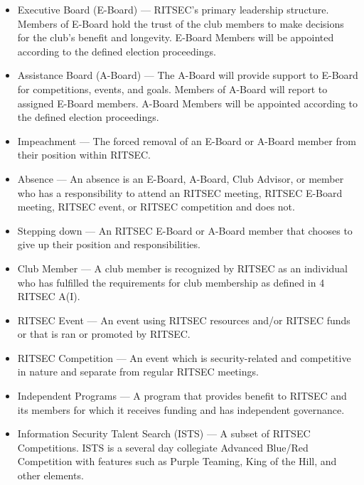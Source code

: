 \begin{itemize}
      \item Executive Board (E-Board) --- RITSEC's primary leadership structure. Members of
            E-Board hold the trust of the club members to make decisions for the club's
            benefit and longevity. E-Board Members will be appointed according to the
            defined election proceedings.

      \item Assistance Board (A-Board) --- The A-Board will provide support to E-Board for
            competitions, events, and goals. Members of A-Board will report to assigned
            E-Board members. A-Board Members will be appointed according to the defined
            election proceedings.

      \item Impeachment --- The forced removal of an E-Board or A-Board member from their
            position within RITSEC.

      \item Absence --- An absence is an E-Board, A-Board, Club Advisor, or member who has
            a responsibility to attend an RITSEC meeting, RITSEC E-Board meeting, RITSEC
            event, or RITSEC competition and does not.

      \item Stepping down --- An RITSEC E-Board or A-Board member that chooses to give up
            their position and responsibilities.

      \item Club Member --- A club member is recognized by RITSEC as an individual who has
            fulfilled the requirements for club membership as defined in 4 RITSEC A(I).

      \item RITSEC Event --- An event using RITSEC resources and/or RITSEC funds or that is
            ran or promoted by RITSEC.

      \item RITSEC Competition --- An event which is security-related and competitive in
            nature and separate from regular RITSEC meetings.

      \item Independent Programs --- A program that provides benefit to RITSEC and its
            members for which it receives funding and has independent governance.

      \item Information Security Talent Search (ISTS) --- A subset of RITSEC Competitions.
            ISTS is a several day collegiate Advanced Blue/Red Competition with features
            such as Purple Teaming, King of the Hill, and other elements.


\end{itemize}
